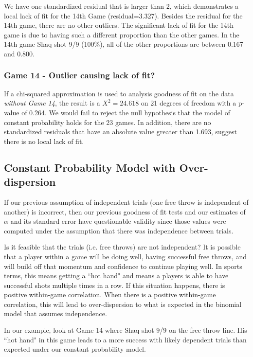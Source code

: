 \documentclass[12pt, letterpaper]{article}
\begin{document}
We  have one standardized residual that is larger than 2, which demonstrates a local lack of fit for the 14th Game (residual=3.327).  Besides the residual for the 14th game, there are no other outliers.  The significant lack of fit for the 14th game is due to having such a different proportion than the other games.  In the 14th game Shaq shot 9/9 (100\%), all of the other proportions are between 0.167 and 0.800. 


\subsubsection{Game 14 - Outlier causing lack of fit?}
If a chi-squared approximation is used to analysis goodness of fit on the data \textit{without Game 14}, the result is a $X^2 = 24.618$ on 21 degrees of freedom with a p-value of 0.264.  We would fail to reject the null hypothesis that the model of constant probability holds for the 23 games.  In addition, there are no standardized residuals that have an absolute value greater than 1.693, suggest there is no local lack of fit.  

\subsection{Constant Probability Model with Over-dispersion} 
If our previous assumption of independent trials (one free throw is independent of another) is incorrect, then our previous goodness of fit tests and our estimates of $\alpha$ and its standard error have questionable validity since those values were computed under the assumption that there was independence between trials.   

Is it feasible that the trials (i.e. free throws) are not independent? It is possible that a player within a game will be doing well, having successful free throws, and will build off that momentum and confidence to continue playing well.  In sports terms, this means getting a ``hot hand" and means a players is able to have successful shots multiple times in a row.  If this situation happens, there is positive within-game correlation.  When there is a positive within-game correlation, this will lead to over-dispersion to what is expected in the binomial model that assumes independence.  

In our example, look at Game 14 where Shaq shot 9/9 on the free throw line.  His ``hot hand" in this game leads to a more success  with likely dependent trials than expected under our constant probability model.  
\end{document}
